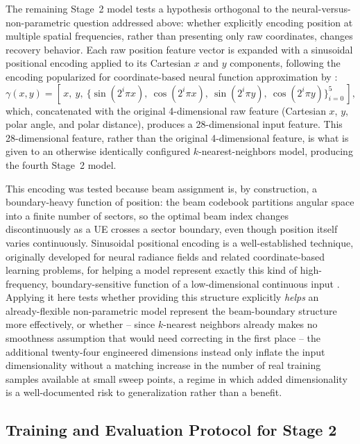 \documentclass{iutbscthesis}
\begin{document}
The remaining Stage~2 model tests a hypothesis orthogonal to the neural-versus-non-parametric question addressed above: whether explicitly encoding position at multiple spatial frequencies, rather than presenting only raw coordinates, changes recovery behavior. Each raw position feature vector is expanded with a sinusoidal positional encoding applied to its Cartesian $x$ and $y$ components, following the encoding popularized for coordinate-based neural function approximation by \textcite{tancik2020fourierfeatures}:
\begin{equation}
    \gamma(x, y) = \left[\, x,\ y,\ \{\sin(2^{i}\pi x),\ \cos(2^{i}\pi x),\ \sin(2^{i}\pi y),\ \cos(2^{i}\pi y)\}_{i=0}^{5} \,\right],
    \label{eq:fourierencoding}
\end{equation}
which, concatenated with the original 4-dimensional raw feature (Cartesian $x$, $y$, polar angle, and polar distance), produces a 28-dimensional input feature. This 28-dimensional feature, rather than the original 4-dimensional feature, is what is given to an otherwise identically configured $k$-nearest-neighbors model, producing the fourth Stage~2 model.

This encoding was tested because beam assignment is, by construction, a boundary-heavy function of position: the beam codebook partitions angular space into a finite number of sectors, so the optimal beam index changes discontinuously as a UE crosses a sector boundary, even though position itself varies continuously. Sinusoidal positional encoding is a well-established technique, originally developed for neural radiance fields and related coordinate-based learning problems, for helping a model represent exactly this kind of high-frequency, boundary-sensitive function of a low-dimensional continuous input \cite{tancik2020fourierfeatures}. Applying it here tests whether providing this structure explicitly \emph{helps} an already-flexible non-parametric model represent the beam-boundary structure more effectively, or whether -- since $k$-nearest neighbors already makes no smoothness assumption that would need correcting in the first place -- the additional twenty-four engineered dimensions instead only inflate the input dimensionality without a matching increase in the number of real training samples available at small sweep points, a regime in which added dimensionality is a well-documented risk to generalization rather than a benefit.

\subsection{Training and Evaluation Protocol for Stage 2}
\label{sec:stage2protocol}
\end{document}
